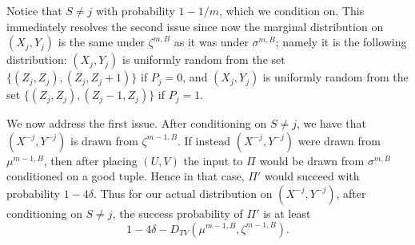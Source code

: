 \documentclass[twoside,leqno,twocolumn]{article}
\begin{document}
\iffalse
Consider a random tuple $(x, y, z, j)$ formed by choosing $(x,y,z)$ from the marginal
distribution of $X$ and $Y$ distributed according to $\zeta^{m,B}$, and independently choosing
$j \in [m]$ uniformly at random. 
Say that $(x, y, z, j)$ is {\it good} if $\Pi(X,Y)$ succeeds with probability at
least $1-O(\delta)$, conditioned on $X^{<j} = x, Y^{<j} = y, Z^{-j} = z$, and 
$(X_j, Y_j)$ being uniform on $\{(0,0), (0, B)\}$. 
For a good $(x,y,z,j)$, 
it follows that
by placing $(U,V)$ on the $j$-th coordinate and outputting whatever $\Pi$ outputs, the
resulting single-coordinate protocol $\Pi'$ for distinguishing
$(0,0)$ from $(0,B)$ under the uniform distribution 
succeeds with probability $1-O(\delta)$. 
Hence, for a good tuple $(x,y,z,j)$, 
$I(X_j, Y_j ; \Pi | Z_j, X^{<j} = x,
Y^{<j} = y, Z^{-j} = z)$ represents the information cost of a protocol $\Pi'$
that succeeds with probability $1-O(\delta)$ 
on the single-coordinate problem of distinguishing
the inputs $(0,0)$ and $(0,B)$. By (\ref{eqn:final}), we then have 
$I(X_j, Y_j ; \Pi' | Z_j) = \Omega(1/B^2)$. Hence, if we can show that 
$\Pr[(x,y,z,j) \textrm{ is good }] = \Omega(1)$, then it
will follow that $I(X_1, Y_1, \ldots, X_m, Y_m ; \Pi | Z) = \Omega(m/B^2)$,
which will complete the proof. 
It remains to show that $\Pr[(x,y,z,j) \textrm{ is good }] = \Omega(1)$. 
\fi

Notice that $S \neq j$ with probability $1-1/m$, which we condition on. This immediately resolves
the second issue since now the marginal distribution on $(X_j, Y_j)$ is the same under $\zeta^{m,B}$
as it was under $\sigma^{m,B}$; namely
it is the following distribution: $(X_j, Y_j)$ is uniformly random from 
the set $\{(Z_j, Z_j), (Z_j, Z_j+1)\}$ if $P_j = 0$, and $(X_j, Y_j)$ is uniformly
random from the set $\{(Z_j, Z_j), (Z_j-1, Z_j)\}$ if $P_j = 1$. 

We now address the first issue.  After conditioning on $S \neq j$, we
have that $(X^{-j}, Y^{-j})$ is drawn from $\zeta^{m-1,B}$.  If
instead $(X^{-j}, Y^{-j})$ were drawn from $\mu^{m-1,B}$, then after
placing $(U, V)$ the input to $\Pi$ would be drawn from $\sigma^{m,B}$
conditioned on a good tuple.  Hence in that case, $\Pi'$ would succeed
with probability $1-4\delta$.  Thus for our actual distribution on
$(X^{-j}, Y^{-j})$, after conditioning on $S \neq j$, the success
probability of $\Pi'$ is at least
$$1-4\delta - D_{TV}(\mu^{m-1,B}, \zeta^{m-1,B}).$$
\end{document}
